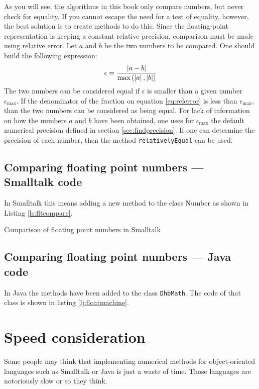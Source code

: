 \documentclass[twoside]{book}
\begin{document}
\noindent As you will see, the algorithms in this book only
compare numbers, but never check for equality. If you cannot
escape the need for a test of equality, however, the best solution
is to create methods to do this. Since the floating-point
representation is keeping a constant relative precision,
comparison must be made using relative error. Let $a$ and $b$ be
the two numbers to be compared. One should build the following
expression:
\begin{equation}
\label{eq:relerror}
\epsilon={\left|a-b\right| \over
\max\left(\left|a\right|,\left|b\right|\right)}
\end{equation}
The two numbers can be considered equal if $\epsilon$ is smaller
than a given number $\epsilon_{\max}$. If the denominator of the
fraction on equation \ref{eq:relerror} is less than
$\epsilon_{\max}$, than the two numbers can be considered as being
equal. For lack of information on how the numbers $a$ and $b$ have
been obtained, one uses for $\epsilon_{\max}$ the default
numerical precision defined in section \ref{sec:findprecision}. If
one can determine the precision of each number, then the method
{\tt relativelyEqual} can be used.

\subsection{Comparing floating point numbers --- Smalltalk code}
In Smalltalk this means adding a new method to the class Number as
shown in Listing \ref{ls:fltcompare}.

\begin{listing}
Comparison of floating point numbers in Smalltalk
\label{ls:fltcompare}

\end{listing}

\subsection{Comparing floating point numbers --- Java code}
\label{sec:eqfltjava} In Java the methods have been added to the
class {\tt DhbMath}. The code of that class is shown in listing
\ref{lj:floatmachine}.

\section{Speed consideration}
\label{sec:speed} Some people may think that implementing
numerical methods for object-oriented languages such as Smalltalk
or Java is just a waste of time. Those languages are notoriously
slow or so they think.
\end{document}
